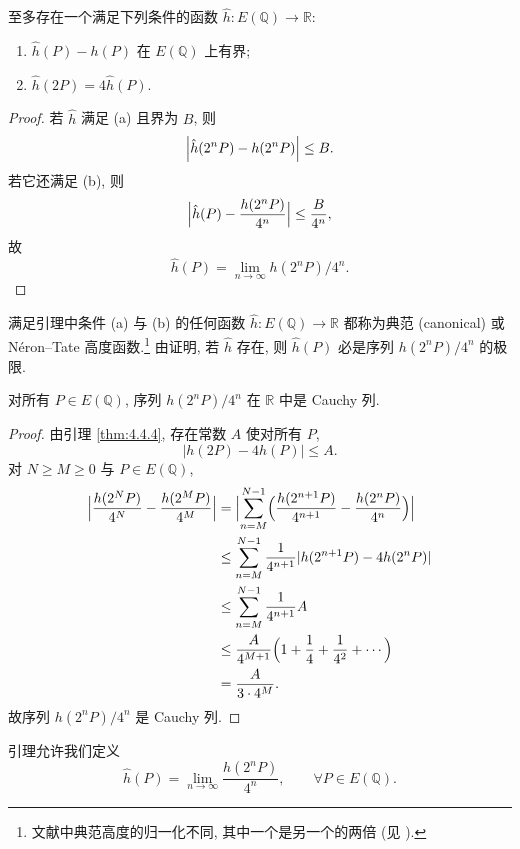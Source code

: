 \begin{lemma} \label{thm:4.4.5} 
至多存在一个满足下列条件的函数 $\hat{h}\colon E(\mathbb{Q})\to\mathbb{R}$:
\begin{enumerate}[label=\textup{(\alph*)}]
\item $\hat{h}(P) - h(P)$ 在 $E(\mathbb{Q})$ 上有界;
\item $\hat{h}(2P) = 4\hat{h}(P)$.
\end{enumerate}
\end{lemma}

\begin{proof}
若 $\hat{h}$ 满足 (a) 且界为 $B$, 则
\[
\Bigl|\hat{h}(2^nP) - h(2^nP)\Bigr|\le B.
\]
若它还满足 (b), 则
\[
\Bigl|\hat{h}(P) - \frac{h(2^nP)}{4^n}\Bigr|\le\frac{B}{4^n},
\]
故
\[
\hat{h}(P) = \lim_{n\to\infty}h(2^nP)/4^n.
\]
\end{proof}

满足引理中条件 (a) 与 (b) 的任何函数 $\hat{h}\colon E(\mathbb{Q})\to\mathbb{R}$ 都称为典范 (canonical) 或 N\'eron--Tate 高度函数.\footnote{文献中典范高度的归一化不同, 其中一个是另一个的两倍 (见 \cite[3.4]{cremona1997}).} 由证明, 若 $\hat{h}$ 存在, 则 $\hat{h}(P)$ 必是序列 $h(2^nP)/4^n$ 的极限.

\begin{lemma} \label{thm:4.4.6} 
对所有 $P\in E(\mathbb{Q})$, 序列 $h(2^nP)/4^n$ 在 $\mathbb{R}$ 中是 Cauchy 列.
\end{lemma}

\begin{proof}
由引理 \ref{thm:4.4.4}, 存在常数 $A$ 使对所有 $P$,
\[
|h(2P) - 4h(P)|\le A.
\]
对 $N\ge M\ge 0$ 与 $P\in E(\mathbb{Q})$,
\begin{align*}
    \Bigl|\frac{h(2^NP)}{4^N} - \frac{h(2^MP)}{4^M}\Bigr|
    & = \Bigl|\sum_{n=M}^{N-1}\Bigl(\frac{h(2^{n+1}P)}{4^{n+1}} - \frac{h(2^nP)}{4^n}\Bigr)\Bigr|
    \\ & \le\sum_{n=M}^{N-1}\frac{1}{4^{n+1}}|h(2^{n+1}P) - 4h(2^nP)|
    \\ & \le\sum_{n=M}^{N-1}\frac{1}{4^{n+1}}A 
    \\ & \le\frac{A}{4^{M+1}}\Bigl(1 + \frac{1}{4} + \frac{1}{4^2} + \cdots\Bigr) 
    \\ & = \frac{A}{3\cdot 4^M}.
\end{align*}
故序列 $h(2^nP)/4^n$ 是 Cauchy 列.
\end{proof}

引理允许我们定义
\[
\hat{h}(P) = \lim_{n\to\infty}\frac{h(2^nP)}{4^n}, \qquad \forall P\in E(\mathbb{Q}).
\]

